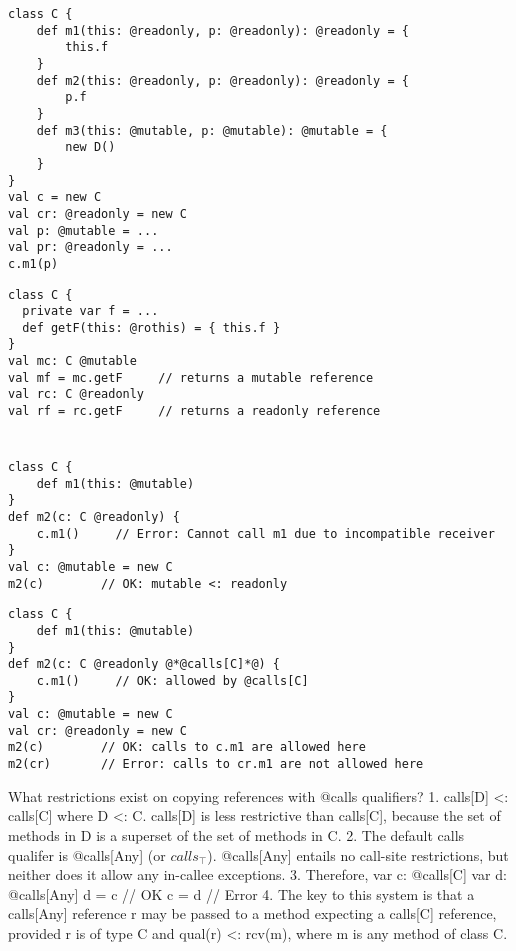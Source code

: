 \begin{lstlisting}[caption={Locality-dependent Results},label={lst-loc},float=htp]
class C {
	def m1(this: @readonly, p: @readonly): @readonly = {
		this.f
	}
	def m2(this: @readonly, p: @readonly): @readonly = {
		p.f
	}
	def m3(this: @mutable, p: @mutable): @mutable = {
		new D()
	}
}
val c = new C
val cr: @readonly = new C
val p: @mutable = ...
val pr: @readonly = ...
c.m1(p)
\end{lstlisting}



\begin{lstlisting}[caption={Polymorphism with {\em rothis}},label={lst-rothis},float=htp]
class C {
  private var f = ...
  def getF(this: @rothis) = { this.f }
}
val mc: C @mutable
val mf = mc.getF     // returns a mutable reference
val rc: C @readonly
val rf = rc.getF     // returns a readonly reference
\end{lstlisting}





\section{}

\begin{lstlisting}
class C {
	def m1(this: @mutable)
}
def m2(c: C @readonly) {
	c.m1()     // Error: Cannot call m1 due to incompatible receiver
}
val c: @mutable = new C
m2(c)        // OK: mutable <: readonly
\end{lstlisting}

\begin{lstlisting}
class C {
	def m1(this: @mutable)
}
def m2(c: C @readonly @*@calls[C]*@) {
	c.m1()     // OK: allowed by @calls[C]
}
val c: @mutable = new C
val cr: @readonly = new C
m2(c)        // OK: calls to c.m1 are allowed here
m2(cr)       // Error: calls to cr.m1 are not allowed here
\end{lstlisting}

What restrictions exist on copying references with @calls qualifiers?
1. calls[D] <: calls[C] where D <: C.
		calls[D] is less restrictive than calls[C],
		because the set of methods in D is a superset of the set of methods in C.
2. The default calls qualifer is @calls[Any] (or $calls_\top$).
		@calls[Any] entails no call-site restrictions, but neither does it allow
		any in-callee exceptions.
3. Therefore,
	var c: @calls[C]
	var d: @calls[Any]
	d = c   // OK
	c = d   // Error
4. The key to this system is that a calls[Any] reference r may be
		passed to a method expecting a calls[C] reference,
		provided r is of type C and qual(r) <: rcv(m), where
		m is any method of class C.

